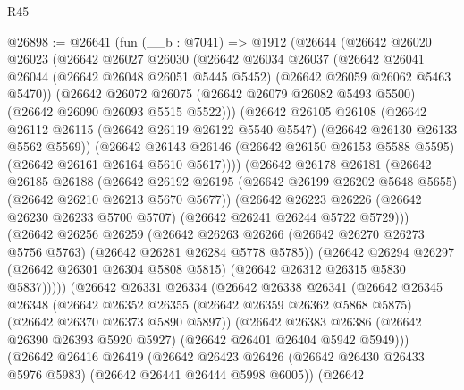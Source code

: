 \begin{lexlean}{R45}
\begin{coremodule}
{@26898 := @26641
    (fun (__b : @7041) =>
    @1912
      (@26644
        (@26642
          @26020
          @26023
          (@26642
            @26027
            @26030
            (@26642
              @26034
              @26037
              (@26642
                @26041
                @26044
                (@26642 @26048 @26051 @5445 @5452)
                (@26642 @26059 @26062 @5463 @5470))
              (@26642
                @26072
                @26075
                (@26642 @26079 @26082 @5493 @5500)
                (@26642 @26090 @26093 @5515 @5522)))
            (@26642
              @26105
              @26108
              (@26642
                @26112
                @26115
                (@26642 @26119 @26122 @5540 @5547)
                (@26642 @26130 @26133 @5562 @5569))
              (@26642
                @26143
                @26146
                (@26642 @26150 @26153 @5588 @5595)
                (@26642 @26161 @26164 @5610 @5617))))
          (@26642
            @26178
            @26181
            (@26642
              @26185
              @26188
              (@26642
                @26192
                @26195
                (@26642 @26199 @26202 @5648 @5655)
                (@26642 @26210 @26213 @5670 @5677))
              (@26642
                @26223
                @26226
                (@26642 @26230 @26233 @5700 @5707)
                (@26642 @26241 @26244 @5722 @5729)))
            (@26642
              @26256
              @26259
              (@26642
                @26263
                @26266
                (@26642 @26270 @26273 @5756 @5763)
                (@26642 @26281 @26284 @5778 @5785))
              (@26642
                @26294
                @26297
                (@26642 @26301 @26304 @5808 @5815)
                (@26642 @26312 @26315 @5830 @5837)))))
        (@26642
          @26331
          @26334
          (@26642
            @26338
            @26341
            (@26642
              @26345
              @26348
              (@26642
                @26352
                @26355
                (@26642 @26359 @26362 @5868 @5875)
                (@26642 @26370 @26373 @5890 @5897))
              (@26642
                @26383
                @26386
                (@26642 @26390 @26393 @5920 @5927)
                (@26642 @26401 @26404 @5942 @5949)))
            (@26642
              @26416
              @26419
              (@26642
                @26423
                @26426
                (@26642 @26430 @26433 @5976 @5983)
                (@26642 @26441 @26444 @5998 @6005))
              (@26642
}
\end{coremodule}
\end{lexlean}
